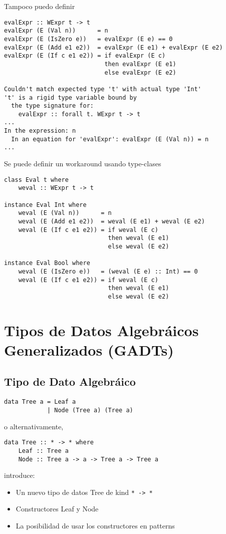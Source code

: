 \documentclass{article}
\newcommand{\imp}[1]{\textcolor{color1}{#1}}
\begin{document}
Tampoco puedo definir

\begin{lstlisting}
evalExpr :: WExpr t -> t
evalExpr (E (Val n))      = n
evalExpr (E (IsZero e))   = evalExpr (E e) == 0
evalExpr (E (Add e1 e2))  = evalExpr (E e1) + evalExpr (E e2)
evalExpr (E (If c e1 e2)) = if evalExpr (E c)
                            then evalExpr (E e1)
                            else evalExpr (E e2)
                            
Couldn't match expected type 't' with actual type 'Int'
't' is a rigid type variable bound by
  the type signature for:
    evalExpr :: forall t. WExpr t -> t
...
In the expression: n
  In an equation for 'evalExpr': evalExpr (E (Val n)) = n
...
\end{lstlisting}

Se puede definir un workaround usando type-clases

\begin{lstlisting}
class Eval t where
    weval :: WExpr t -> t

instance Eval Int where
    weval (E (Val n))      = n
    weval (E (Add e1 e2))  = weval (E e1) + weval (E e2)
    weval (E (If c e1 e2)) = if weval (E c) 
                             then weval (E e1) 
                             else weval (E e2)

instance Eval Bool where
    weval (E (IsZero e))   = (weval (E e) :: Int) == 0
    weval (E (If c e1 e2)) = if weval (E c) 
                             then weval (E e1)
                             else weval (E e2)
\end{lstlisting}

\section{Tipos de Datos Algebráicos Generalizados (GADTs)}

\subsection{Tipo de Dato Algebráico}

\begin{lstlisting}
data Tree a = Leaf a
            | Node (Tree a) (Tree a)
\end{lstlisting}

o alternativamente,
\begin{lstlisting}
data Tree :: * -> * where
    Leaf :: Tree a
    Node :: Tree a -> a -> Tree a -> Tree a
\end{lstlisting}
introduce:
\begin{itemize}
\item Un nuevo tipo de datos \imp{Tree} de kind \texttt{* -> *}
\item Constructores \imp{Leaf} y \imp{Node}
\item La posibilidad de usar los constructores en patterns 
\end{itemize}
\end{document}
